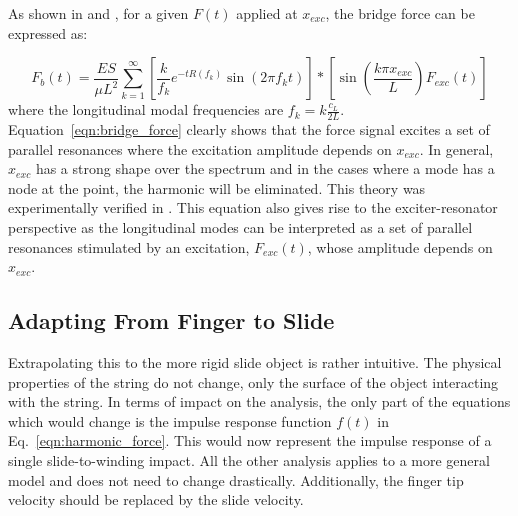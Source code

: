 \documentclass[main.tex]{subfiles}
\begin{document}
As shown in  and , for a given $F(t)$ applied at $x_{exc}$, the bridge force can be expressed as:

\begin{equation}
    F_b(t) = \frac{ES}{\mu L^2} \sum_{k = 1}^{\infty} \left[\frac{k}{f_k} e^{-t R(f_k)} \sin(2\pi f_k t)\right] \ast \left[ \sin\left(\frac{k \pi x_{exc}}{L}\right) F_{exc}(t)\right]
    \label{eqn:bridge_force}
\end{equation}
where the longitudinal modal frequencies are $f_k = k \frac{c_L}{2L}$. Equation~\ref{eqn:bridge_force} clearly shows that the force signal excites a set of parallel resonances where the excitation amplitude depends on $x_{exc}$. In general, $x_{exc}$ has a strong shape over the spectrum and in the cases where a mode has a node at the point, the harmonic will be eliminated. This theory was experimentally verified in . This equation also gives rise to the exciter-resonator perspective as the longitudinal modes can be interpreted as a set of parallel resonances stimulated by an excitation, $F_{exc}(t)$, whose amplitude depends on $x_{exc}$.

\subsection{Adapting From Finger to Slide}
Extrapolating this to the more rigid slide object is rather intuitive. The physical properties of the string do not change, only the surface of the object interacting with the string. In terms of impact on the analysis, the only part of the equations which would change is the impulse response function $f(t)$ in Eq.~\ref{eqn:harmonic_force}. This would now represent the impulse response of a single slide-to-winding impact. All the other analysis applies to a more general model and does not need to change drastically. Additionally, the finger tip velocity should be replaced by the slide velocity.
\end{document}
